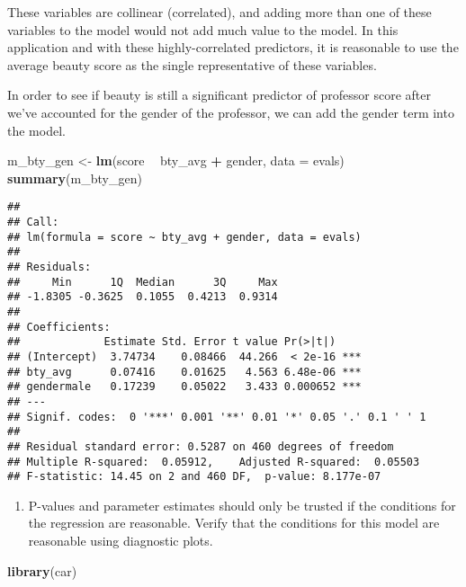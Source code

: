 \documentclass[]{article}
\newenvironment{Shaded}{\begin{snugshade}}{\end{snugshade}}
\newcommand{\KeywordTok}[1]{\textcolor[rgb]{0.13,0.29,0.53}{\textbf{#1}}}
\newcommand{\DataTypeTok}[1]{\textcolor[rgb]{0.13,0.29,0.53}{#1}}
\newcommand{\StringTok}[1]{\textcolor[rgb]{0.31,0.60,0.02}{#1}}
\newcommand{\OperatorTok}[1]{\textcolor[rgb]{0.81,0.36,0.00}{\textbf{#1}}}
\newcommand{\NormalTok}[1]{#1}
\providecommand{\tightlist}{%
  \setlength{\itemsep}{0pt}\setlength{\parskip}{0pt}}
\begin{document}
These variables are collinear (correlated), and adding more than one of
these variables to the model would not add much value to the model. In
this application and with these highly-correlated predictors, it is
reasonable to use the average beauty score as the single representative
of these variables.

In order to see if beauty is still a significant predictor of professor
score after we've accounted for the gender of the professor, we can add
the gender term into the model.

\begin{Shaded}
\begin{Highlighting}[]
\NormalTok{m_bty_gen <-}\StringTok{ }\KeywordTok{lm}\NormalTok{(score }\OperatorTok{~}\StringTok{ }\NormalTok{bty_avg }\OperatorTok{+}\StringTok{ }\NormalTok{gender, }\DataTypeTok{data =}\NormalTok{ evals)}
\KeywordTok{summary}\NormalTok{(m_bty_gen)}
\end{Highlighting}
\end{Shaded}

\begin{verbatim}
## 
## Call:
## lm(formula = score ~ bty_avg + gender, data = evals)
## 
## Residuals:
##     Min      1Q  Median      3Q     Max 
## -1.8305 -0.3625  0.1055  0.4213  0.9314 
## 
## Coefficients:
##             Estimate Std. Error t value Pr(>|t|)    
## (Intercept)  3.74734    0.08466  44.266  < 2e-16 ***
## bty_avg      0.07416    0.01625   4.563 6.48e-06 ***
## gendermale   0.17239    0.05022   3.433 0.000652 ***
## ---
## Signif. codes:  0 '***' 0.001 '**' 0.01 '*' 0.05 '.' 0.1 ' ' 1
## 
## Residual standard error: 0.5287 on 460 degrees of freedom
## Multiple R-squared:  0.05912,    Adjusted R-squared:  0.05503 
## F-statistic: 14.45 on 2 and 460 DF,  p-value: 8.177e-07
\end{verbatim}

\begin{enumerate}
\def\labelenumi{\arabic{enumi}.}
\setcounter{enumi}{6}
\tightlist
\item
  P-values and parameter estimates should only be trusted if the
  conditions for the regression are reasonable. Verify that the
  conditions for this model are reasonable using diagnostic plots.
\end{enumerate}

\begin{Shaded}
\begin{Highlighting}[]
\KeywordTok{library}\NormalTok{(car)}
\end{Highlighting}
\end{Shaded}
\end{document}
